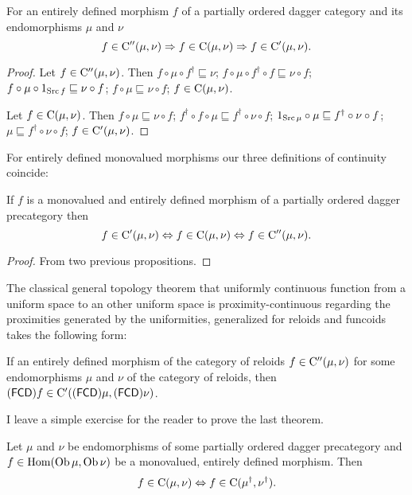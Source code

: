 \begin{prop}
For an entirely defined morphism $f$ of a partially ordered dagger
category and its endomorphisms $\mu$ and $\nu$
\[
f\in\mathrm{C}''(\mu,\nu)\Rightarrow f\in\mathrm{C}(\mu,\nu)\Rightarrow f\in\mathrm{C}'(\mu,\nu).
\]
\end{prop}
\begin{proof}
Let $f\in\mathrm{C}''(\mu,\nu)$. Then $f\circ\mu\circ f^{\dagger}\sqsubseteq\nu$;
$f\circ\mu\circ f^{\dagger}\circ f\sqsubseteq\nu\circ f$; $f\circ\mu\circ1_{\operatorname{Src} f}\sqsubseteq\nu\circ f$;
$f\circ\mu\sqsubseteq\nu\circ f$; $f\in\mathrm{C}(\mu,\nu)$.

Let $f\in\mathrm{C}(\mu,\nu)$. Then $f\circ\mu\sqsubseteq\nu\circ f$;
$f^{\dagger}\circ f\circ\mu\sqsubseteq f^{\dagger}\circ\nu\circ f$;
$1_{\operatorname{Src}\mu}\circ\mu\sqsubseteq f^{\dagger}\circ\nu\circ f$; $\mu\sqsubseteq f^{\dagger}\circ\nu\circ f$;
$f\in\mathrm{C}'(\mu,\nu)$.
\end{proof}
For entirely defined monovalued morphisms our three definitions of
continuity coincide:
\begin{thm}\label{cont-eq}
If $f$ is a monovalued and entirely defined morphism of a partially
ordered dagger precategory then
\[
f\in\mathrm{C}'(\mu,\nu)\Leftrightarrow f\in\mathrm{C}(\mu,\nu)\Leftrightarrow f\in\mathrm{C}''(\mu,\nu).
\]
\end{thm}
\begin{proof}
From two previous propositions.
\end{proof}
The classical general topology theorem that uniformly continuous function
from a uniform space to an other uniform space is proximity-continuous
regarding the proximities generated by the uniformities, generalized
for reloids and funcoids takes the following form:
\begin{thm}
If an entirely defined morphism of the category of reloids $f\in\mathrm{C}''(\mu,\nu)$
for some endomorphisms $\mu$ and $\nu$ of the category of reloids,
then $\mathsf{(\mathsf{FCD})}f\in\mathrm{C}'((\mathsf{FCD})\mu,(\mathsf{FCD})\nu)$.\end{thm}
\begin{xca}
I leave a simple exercise for the reader to prove the last theorem.
\end{xca}

\begin{thm}
Let $\mu$ and $\nu$ be endomorphisms of some partially ordered dagger precategory and
$f\in\operatorname{Hom}(\operatorname{Ob}\mu,\operatorname{Ob}\nu)$ be a monovalued, entirely defined morphism. Then
\[ f\in\mathrm{C}(\mu,\nu)\Leftrightarrow f\in\mathrm{C}(\mu^{\dagger},\nu^{\dagger}). \]
\end{thm}

